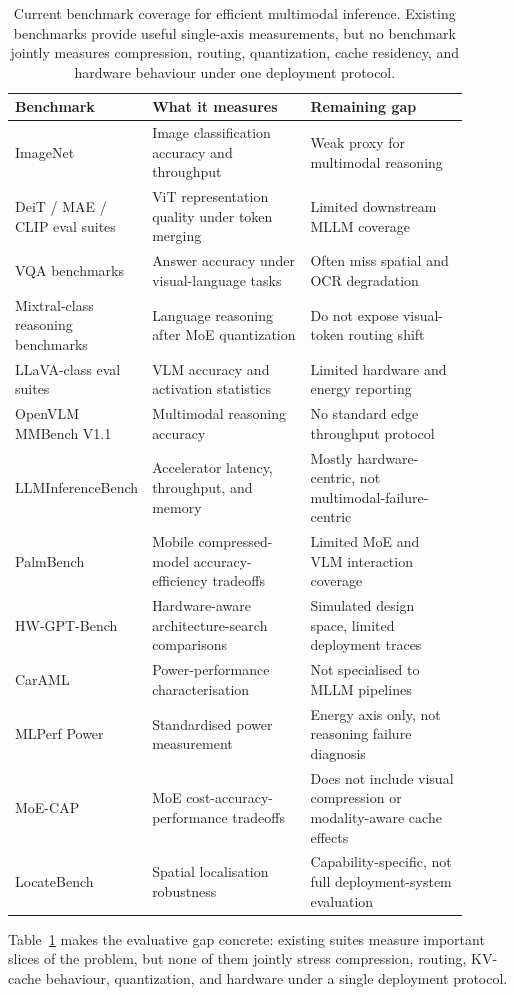 \documentclass[10pt]{article}
\begin{document}
\begin{table}[t]
\centering
\caption{Current benchmark coverage for efficient multimodal inference.  Existing
benchmarks provide useful single-axis measurements, but no benchmark jointly measures
compression, routing, quantization, cache residency, and hardware behaviour under one
deployment protocol.}
\label{tab:benchmarks}
\small
\setlength{\tabcolsep}{4pt}
\begin{tabular}{p{0.2\linewidth} p{0.35\linewidth} p{0.35\linewidth}}
\toprule
\textbf{Benchmark} & \textbf{What it measures} & \textbf{Remaining gap} \\
\midrule
ImageNet & Image classification accuracy and throughput & Weak proxy for multimodal reasoning \\
DeiT / MAE / CLIP eval suites & ViT representation quality under token merging & Limited downstream MLLM coverage \\
VQA benchmarks & Answer accuracy under visual-language tasks & Often miss spatial and OCR degradation \\
Mixtral-class reasoning benchmarks & Language reasoning after MoE quantization & Do not expose visual-token routing shift \\
LLaVA-class eval suites & VLM accuracy and activation statistics & Limited hardware and energy reporting \\
OpenVLM MMBench V1.1 & Multimodal reasoning accuracy & No standard edge throughput protocol \\
LLMInferenceBench & Accelerator latency, throughput, and memory & Mostly hardware-centric, not multimodal-failure-centric \\
PalmBench & Mobile compressed-model accuracy-efficiency tradeoffs & Limited MoE and VLM interaction coverage \\
HW-GPT-Bench & Hardware-aware architecture-search comparisons & Simulated design space, limited deployment traces \\
CarAML & Power-performance characterisation & Not specialised to MLLM pipelines \\
MLPerf Power & Standardised power measurement & Energy axis only, not reasoning failure diagnosis \\
MoE-CAP & MoE cost-accuracy-performance tradeoffs & Does not include visual compression or modality-aware cache effects \\
LocateBench & Spatial localisation robustness & Capability-specific, not full deployment-system evaluation \\
\bottomrule
\end{tabular}
\end{table}
Table~\ref{tab:benchmarks} makes the evaluative gap concrete: existing suites measure
important slices of the problem, but none of them jointly stress compression, routing,
KV-cache behaviour, quantization, and hardware under a single deployment protocol.
\end{document}
